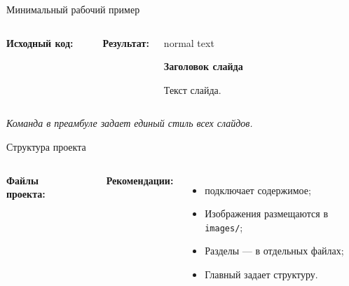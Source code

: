 \begin{frame}[fragile,label=minimal]{Минимальный рабочий пример}
  \begin{columns}[T,onlytextwidth]
      \textbf{Исходный код:}
      \vspace{0.2em}
      \inputminted[fontsize=\scriptsize, frame=single, breaklines=true]{latex}{examples/minimal.tex}

      \textbf{Результат:}
      \vspace{0.2em}
      \begin{beamercolorbox}[wd=\linewidth, sep=4pt, rounded=true, shadow=true]{normal text}
        \small
        \begin{center}
          \textbf{Заголовок слайда}
        \end{center}
        \vspace{0.5em}
        Текст слайда.
      \end{beamercolorbox}
  \end{columns}

  \vspace{0.5em}
  \centering
  \emph{Команда  в преамбуле задает единый стиль всех слайдов.}
\end{frame}

\begin{frame}[fragile,label=structure]{Структура проекта}
  \begin{columns}[T,onlytextwidth]
      \textbf{Файлы проекта:}
      \vspace{0.2em}
      \inputminted[fontsize=\scriptsize, frame=single, breaklines=true]{text}{examples/tree.txt}

      \textbf{Рекомендации:}
      \vspace{0.2em}
      \begin{itemize}
        \item {} подключает содержимое;
        \item Изображения размещаются в \texttt{images/};
        \item Разделы --- в отдельных файлах;
        \item Главный задает структуру.
      \end{itemize}
  \end{columns}
\end{frame}

